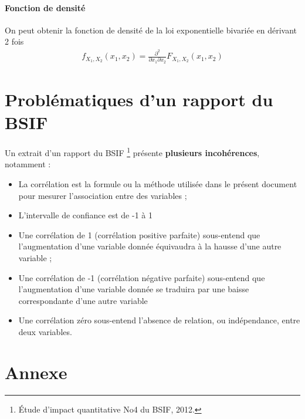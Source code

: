 \documentclass[10pt, french]{article}
\begin{document}
\begin{multicols*}{2}
\paragraph{Fonction de densité} On peut obtenir la fonction de densité de la loi exponentielle bivariée en dérivant 2 fois
\begin{align*}
f_{X_1, X_2}(x_1, x_2) = \frac{\partial^2}{\partial x_1 \partial x_2} F_{X_1, X_2}(x_1, x_2)
\end{align*}



\section{Problématiques d'un rapport du BSIF}
Un extrait d'un rapport du BSIF \footnote{Étude d'impact quantitative No4 du BSIF, 2012.}  présente \textbf{plusieurs incohérences}, notamment : 

\begin{itemize}
\item La corrélation est la formule ou la méthode utilisée dans le présent document pour mesurer l'association entre des variables ; 
\item L'intervalle de confiance est de -1  à 1
\item Une corrélation de 1 (corrélation positive parfaite) sous-entend que l'augmentation d'une variable donnée équivaudra à la hausse d'une autre variable ;
\item Une corrélation de -1 (corrélation négative parfaite) sous-entend que l'augmentation d'une variable donnée se traduira par une baisse correspondante d'une autre variable
\item Une corrélation zéro sous-entend l'absence de relation, ou indépendance, entre deux variables.
\end{itemize}




\newpage
\section{Annexe}


\end{multicols*}




\end{document}

